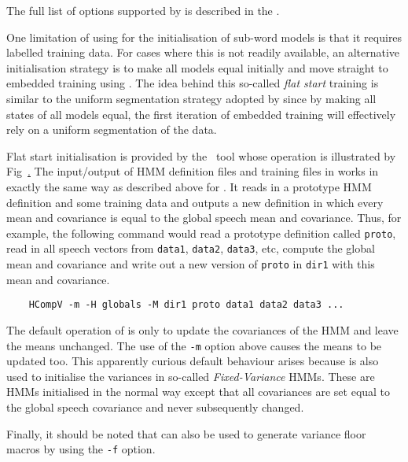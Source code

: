 The full list of options supported by  is described in the .


One limitation of using  for the initialisation
of sub-word models is that it requires labelled training data.
For cases where this is not readily available, an alternative
initialisation strategy is to make all models equal initially and
move straight to embedded training using .  The
idea behind this so-called \textit{flat start} training is similar to the
uniform segmentation strategy adopted by  since by making
all states of all models equal, the first iteration of embedded training
will effectively rely on a uniform segmentation of the data.


Flat start initialisation is provided by the \HTK\ tool  whose operation
is illustrated by Fig~\href{f:flatst}.  The input/output of HMM definition files
and training files in  works in exactly the same way as described above for
.  It reads in a prototype HMM definition and some training data
and outputs a new definition in which every mean and covariance is equal to 
the global speech mean and covariance.  Thus, for example, the following
command would read a prototype definition called \texttt{proto}, read in all speech
vectors from \texttt{data1}, \texttt{data2}, \texttt{data3}, etc, 
compute the global mean and covariance
and write out a new version of \texttt{proto} in \texttt{dir1} with this mean and
covariance.
\begin{verbatim}
    HCompV -m -H globals -M dir1 proto data1 data2 data3 ...
\end{verbatim}

The default operation of  is only to update the covariances of the HMM
and leave the means unchanged.  The use of the \texttt{-m} option above causes the
means to be updated too.  This apparently curious default behaviour arises because
 is also used to initialise the variances in so-called
\textit{Fixed-Variance} HMMs. These are HMMs initialised in the normal way except
that all covariances are set equal to the global speech covariance and never
subsequently changed.

Finally, it should be noted that  can also be used to generate 
variance floor macros by using the \texttt{-f} option.

